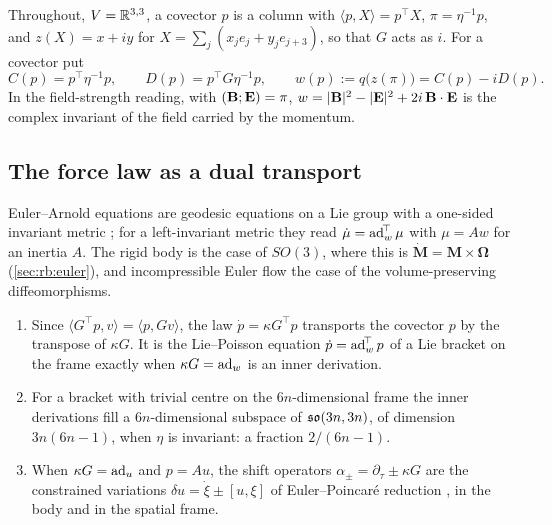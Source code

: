 Throughout, $V=\mathbb{R}^{3,3}$, a covector $p$ is a column with $\langle p,X\rangle=p^{\!\top}X$, $\pi=\eta^{-1}p$, and $z(X)=x+iy$ for
$X=\sum_j(x_je_j+y_je_{j+3})$, so that $G$ acts as $i$. For a covector put
\begin{equation}
\label{eq:wdef}
C(p)=p^{\!\top}\eta^{-1}p,\qquad D(p)=p^{\!\top}G\eta^{-1}p,\qquad w(p):=q\bigl(z(\pi)\bigr)=C(p)-iD(p).
\end{equation}
In the field-strength reading, with $(\mathbf B;\mathbf E)=\pi$, $w=|\mathbf B|^2-|\mathbf E|^2+2i\,\mathbf B\cdot\mathbf E$ is the complex invariant of the field carried by the
momentum.

\subsection{The force law as a dual transport}

Euler--Arnold equations are geodesic equations on a Lie group with a one-sided invariant metric \cite{Arnold66,ArnoldKhesin98}; for a
left-invariant metric they read $\dot\mu=\operatorname{ad}_w^{\!\top}\mu$ with $\mu=Aw$ for an inertia $A$. The rigid body is the case of $SO(3)$, where this is
$\dot{\mathbf M}=\mathbf M\times\boldsymbol\Omega$ (\cref{sec:rb:euler}), and incompressible Euler flow the case of the volume-preserving diffeomorphisms.

\begin{proposition}
\label{prop:EAdict}
\begin{enumerate}[label=(\roman*),leftmargin=2.2em]
\item Since $\langle G^{\!\top}p,v\rangle=\langle p,Gv\rangle$, the law $\dot p=\kappa G^{\!\top}p$ transports the covector $p$ by the transpose of $\kappa G$.
It is the Lie--Poisson equation $\dot p=\operatorname{ad}_w^{\!\top}p$ of a Lie bracket on the frame exactly when $\kappa G=\operatorname{ad}_w$ is an inner derivation.
\item For a bracket with trivial centre on the $6n$-dimensional frame the inner derivations fill a $6n$-dimensional subspace of $\mathfrak{so}(3n,3n)$, of
dimension $3n(6n-1)$, when $\eta$ is invariant: a fraction $2/(6n-1)$.
\item When $\kappa G=\operatorname{ad}_u$ and $p=Au$, the shift operators $\alpha_\pm=\partial_\tau\pm\kappa G$ are the constrained variations
$\delta u=\dot\xi\pm[u,\xi]$ of Euler--Poincar\'e reduction \cite{MarsdenRatiu99,HolmMarsdenRatiu98}, in the body and in the spatial frame.
\end{enumerate}
\end{proposition}

